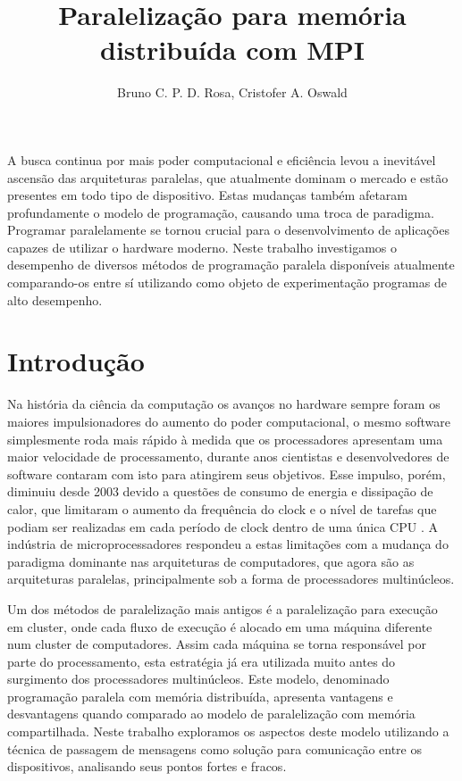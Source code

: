 \documentclass[12pt]{article}
\title{Paralelização para memória distribuída com MPI}
\author{Bruno C. P. D. Rosa, Cristofer A. Oswald}
\begin{document}
 

\maketitle
     
\begin{resumo} 
  A busca continua por mais poder computacional e eficiência levou a inevitável ascensão das arquiteturas paralelas, que atualmente dominam o mercado e estão presentes em todo tipo de dispositivo. Estas mudanças também afetaram profundamente o modelo de programação, causando uma troca de paradigma. Programar paralelamente se tornou crucial para o desenvolvimento de aplicações capazes de utilizar o hardware moderno. Neste trabalho investigamos o desempenho de diversos métodos de programação paralela disponíveis atualmente comparando-os entre sí utilizando como objeto de experimentação programas de alto desempenho.
\end{resumo}


\section{Introdução}
Na história da ciência da computação os avanços no hardware sempre foram os maiores impulsionadores do aumento do poder computacional, o mesmo software simplesmente roda mais rápido à medida que os processadores apresentam uma maior velocidade de processamento, durante anos cientistas e desenvolvedores de software contaram com isto para atingirem seus objetivos. Esse impulso, porém, diminuiu desde 2003 devido a questões de consumo de energia e dissipação de calor, que limitaram o aumento da frequência do clock e o nível de tarefas que podiam ser realizadas em cada período de clock dentro de uma única CPU \cite{kirk2011programming}. A indústria de microprocessadores respondeu a estas limitações com a mudança do paradigma dominante nas arquiteturas de computadores, que agora são as arquiteturas paralelas, principalmente sob a forma de processadores multinúcleos.

Um dos métodos de paralelização mais antigos é a paralelização para execução em cluster, onde cada fluxo de execução é alocado em uma máquina diferente num cluster de computadores. Assim cada máquina se torna responsável por parte do processamento, esta estratégia já era utilizada muito antes do surgimento dos processadores multinúcleos. Este modelo, denominado programação paralela com memória distribuída, apresenta vantagens e desvantagens quando comparado ao modelo de paralelização com memória compartilhada. Neste trabalho exploramos os aspectos deste modelo utilizando a técnica de passagem de mensagens como solução para comunicação entre os dispositivos, analisando seus pontos fortes e fracos.
\end{document}
